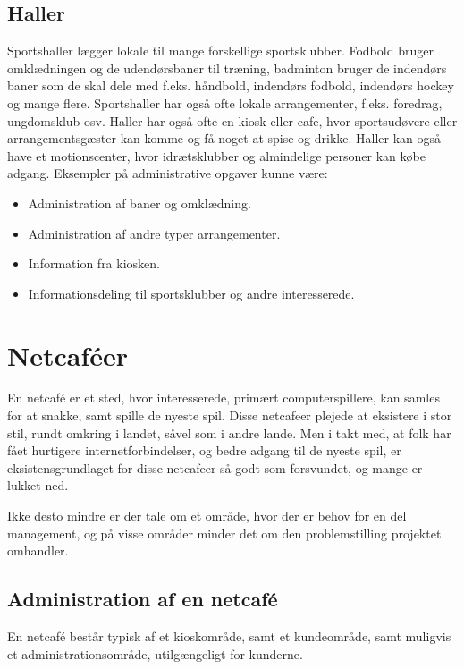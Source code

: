 \subsection{Haller}
Sportshaller lægger lokale til mange forskellige sportsklubber. Fodbold bruger omklædningen og de udendørsbaner til træning, badminton bruger de indendørs baner som de skal dele med f.eks. håndbold, indendørs fodbold, indendørs hockey og mange flere. Sportshaller har også ofte lokale arrangementer, f.eks. foredrag, ungdomsklub osv. 
Haller har også ofte en kiosk eller cafe, hvor sportsudøvere eller arrangementsgæster kan komme og få noget at spise og drikke. 
Haller kan også have et motionscenter, hvor idrætsklubber og almindelige personer kan købe adgang. 
Eksempler på administrative opgaver kunne være:
\begin{itemize}
\item Administration af baner og omklædning.
\item Administration af andre typer arrangementer.
\item Information fra kiosken.
\item Informationsdeling til sportsklubber og andre interesserede.
\end{itemize}

\section{Netcaféer}\label{chap:netcafeer}

En netcafé er et sted, hvor interesserede, primært computerspillere, kan samles for at snakke, samt spille de
nyeste spil. Disse netcafeer plejede at eksistere i stor stil, rundt omkring i landet, såvel som i andre
lande. Men i takt med, at folk har fået hurtigere internetforbindelser, og bedre adgang til de nyeste spil, er
eksistensgrundlaget for disse netcafeer så godt som forsvundet, og mange er lukket ned.

Ikke desto mindre er der tale om et område, hvor der er behov for en del management, og på visse områder
minder det om den problemstilling projektet omhandler.


\subsection{Administration af en netcafé}\label{sec:administration-af-en-netcafe}

En netcafé består typisk af et kioskområde, samt et kundeområde, samt muligvis et administrationsområde,
utilgængeligt for kunderne.

